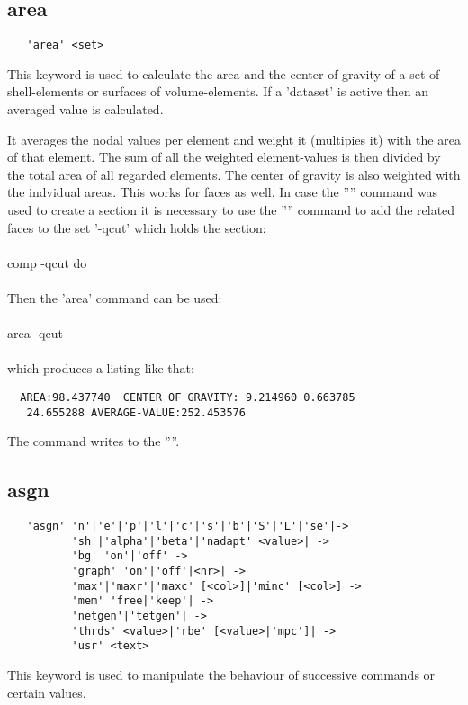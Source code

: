 \documentclass{article}
\begin{document}
\subsection{\label{area}area}
\begin{verbatim}
   'area' <set> 
\end{verbatim}
This keyword is used to calculate the area and the center of gravity of a set of shell-elements or surfaces of volume-elements. If a 'dataset' is active then an averaged value is calculated.

It averages the nodal values per element and weight it (multipies it) with the area of that element. The sum of all the weighted element-values is then divided by the total area of all regarded elements. The center of gravity is also weighted with the indvidual areas. This works for faces as well. In case the '''' command was used to create a section it is necessary to use the '''' command to add the related faces to the set '-qcut' which holds the section:\\\\comp -qcut do\\\\Then the 'area' command can be used:\\\\area -qcut\\\\which produces a listing like that:
\begin{verbatim}
  AREA:98.437740  CENTER OF GRAVITY: 9.214960 0.663785
   24.655288 AVERAGE-VALUE:252.453576
\end{verbatim}

The command writes to the ''''.

\subsection{\label{asgn}asgn}
\begin{verbatim}
   'asgn' 'n'|'e'|'p'|'l'|'c'|'s'|'b'|'S'|'L'|'se'|->
          'sh'|'alpha'|'beta'|'nadapt' <value>| ->
          'bg' 'on'|'off' ->
          'graph' 'on'|'off'|<nr>| ->
          'max'|'maxr'|'maxc' [<col>]|'minc' [<col>] ->
          'mem' 'free|'keep'| ->
          'netgen'|'tetgen'| ->
          'thrds' <value>|'rbe' [<value>|'mpc']| ->
          'usr' <text>
\end{verbatim}
This keyword is used to manipulate the behaviour of successive commands or certain values.
\end{document}
